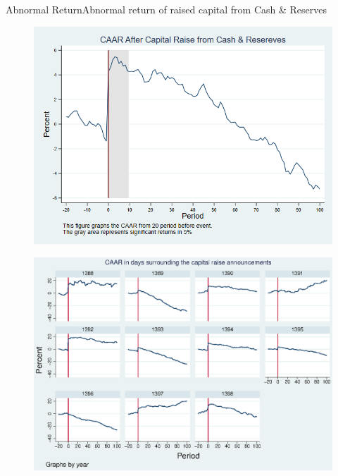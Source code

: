 \documentclass{beamer}
\begin{document}
\begin{frame}{Abnormal Return}{Abnormal return of raised capital from Cash \& Reserves}
\label{abreturnhybrid}
\begin{figure}
\centering
\includegraphics[width=0.65\linewidth]{AbReturnHybrid}
\label{fig:abreturnhybrid}
\end{figure}
\hfill\hyperlink{abreturnhybrid4Factor}{}
\end{frame}


\begin{frame}
\label{AbReturn_year}
\begin{figure}
\centering
\includegraphics[width=0.85\linewidth]{AbReturn_year.eps}
\label{fig:AbReturn_year}
\end{figure}


\end{frame}
\end{document}
